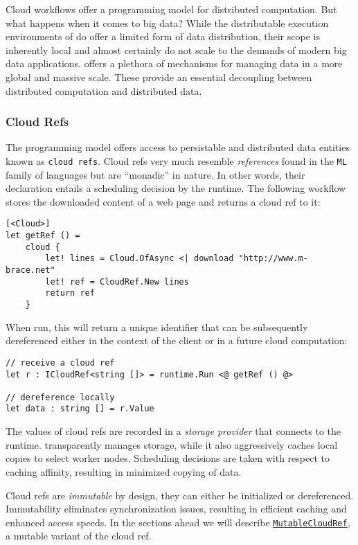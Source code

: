 Cloud workflows offer a programming model for distributed computation.
But what happens when it comes to big data?
While the distributable execution environments of \mbrace{} do offer a
limited form of data distribution, their scope is inherently local
and almost certainly do not scale to the demands of modern big data applications.
\Mbrace{} offers a plethora of mechanisms for managing data in a more global and massive
scale. These provide an essential decoupling between distributed computation and
distributed data.

\subsubsection*{Cloud Refs}

The \mbrace{} programming model offers access to persistable and distributed data entities
known as \texttt{cloud refs}. Cloud refs very much resemble \emph{references} found in the 
\texttt{ML} family of languages but are “monadic” in nature. In other words, their declaration
entails a scheduling decision by the runtime. The following workflow stores the downloaded
content of a web page
and returns a cloud ref to it:
\begin{lstlisting}
[<Cloud>]
let getRef () =
    cloud {
        let! lines = Cloud.OfAsync <| download "http://www.m-brace.net"
        let! ref = CloudRef.New lines
        return ref
    }
\end{lstlisting}
When run, this will return a unique identifier that can be subsequently 
dereferenced either in the context of the client or in a future cloud computation:
\begin{lstlisting}
// receive a cloud ref
let r : ICloudRef<string []> = runtime.Run <@ getRef () @>

// dereference locally
let data : string [] = r.Value
\end{lstlisting}

The values of cloud refs are recorded in a \emph{storage provider} that
connects to the \mbrace{} runtime. \Mbrace{} transparently manages storage,
while it also aggressively caches local copies to select worker nodes.
Scheduling decisions are taken with respect to caching affinity, 
resulting in minimized copying of data.

Cloud refs are \emph{immutable} by design, they can either be initialized or dereferenced.
Immutability eliminates synchronization issues, resulting in efficient caching 
and enhanced access speeds. In the sections ahead we will describe
\hyperref[mutableCloudRef]{\texttt{MutableCloudRef}}, a mutable variant of the cloud ref.

